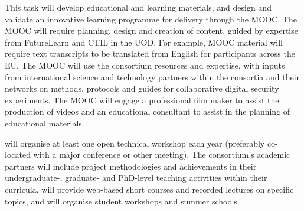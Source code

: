 \begin{Workpackage}{\thewpno}
\begin{Task}

\TaskResults{%
\ref{del:mooc}
\ref{del:dissemplan3}
}
\TaskHeader{}

This task will develop educational and learning materials, and
design and validate an innovative learning programme for delivery through the \TheProject{} MOOC. The MOOC will require planning, design and creation of content, guided by expertise from FutureLearn and CTIL in the UOD.  For example, MOOC material will require 
 text transcripts to be translated from English for participants across the EU. The MOOC will use the \TheProject{}
consortium resources and expertise, with inputs from international science and technology partners within the \TheProject{}
consortia and their networks on methods, protocols and guides for collaborative digital security experiments.  The MOOC will engage a professional film maker to assist the production of videos and an educational consultant to assist in the planning of educational materials.


\TheProject{} will organise at least one open technical workshop each year
(preferably co-located with a major conference or other meeting).
The consortium's academic partners will include project methodologies and achievements in their undergraduate-, graduate- and PhD-level teaching activities within their curricula, will provide web-based short courses and recorded lectures on specific \TheProject topics, and will organise student workshops and summer schools.
\end{Task}


\end{Workpackage}
